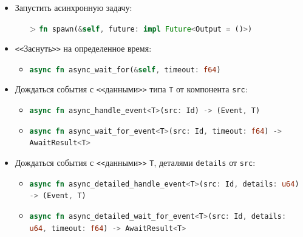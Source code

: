\documentclass[t]{beamer}  %
\begin{document}
 \begin{frame}[fragile]
	\frametitle{\insertsection} 
	\framesubtitle{\insertsubsection}

	\begin{columns}
\begin{column}[t]{1.1\linewidth}
	\vspace{-0.5cm}
	\begin{itemize}
		\setlength{\itemsep}{0.7em} 
		\item Запустить асинхронную задачу: 
		\begin{itemize}
			\item[\footnotesize\textgreater]  \lstinline[language=Rust, basicstyle=\footnotesize\ttfamily]{fn spawn(&self, future: impl Future<Output = ()>)}
		\end{itemize}
		\item \texttt{<\textless}Заснуть\texttt{>\textgreater} на определенное время:
			\begin{itemize}
				\setlength{\itemsep}{0.5em} 
				\item[\footnotesize\textgreater]  \lstinline[language=Rust, basicstyle=\footnotesize\ttfamily]{async fn async_wait_for(&self, timeout: f64)}
			\end{itemize}
		\item Дождаться события с \texttt{<\textless}данными\texttt{>\textgreater} типа \texttt{T} от компонента \texttt{src}:
			\begin{itemize}
				\setlength{\itemsep}{0.5em} 
				\item[\footnotesize\textgreater] \lstinline[language=Rust,basicstyle=\footnotesize\ttfamily]{async fn async_handle_event<T>(src: Id) -> (Event, T)}
				\item[\footnotesize\textgreater] \lstinline[language=Rust,basicstyle=\footnotesize\ttfamily]{async fn async_wait_for_event<T>(src: Id, timeout: f64) -> AwaitResult<T>}
			\end{itemize}
		\item Дождаться события с \texttt{<\textless}данными\texttt{>\textgreater} \texttt{T}, деталями \texttt{details} от \texttt{src}:
		\begin{itemize}
			\setlength{\itemsep}{0.5em} 
			\item[\footnotesize\textgreater]\lstinline[language=Rust,basicstyle=\footnotesize\ttfamily]{async fn async_detailed_handle_event<T>(src: Id, details: u64) -> (Event, T)}
			\item[\footnotesize\textgreater]  \lstinline[language=Rust,basicstyle=\footnotesize\ttfamily]{async fn async_detailed_wait_for_event<T>(src: Id, details: u64, timeout: f64) -> AwaitResult<T>}
		\end{itemize}
	\end{itemize}
\end{column}
\end{columns}
 \end{frame}
\end{document}
